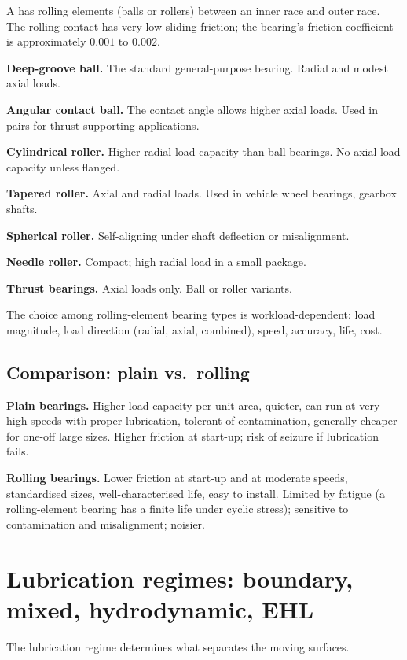 A  has rolling elements (balls or rollers) between an inner race and outer race. The rolling contact has very low sliding friction; the bearing's friction coefficient is approximately $0.001$ to $0.002$.

\textbf{Deep-groove ball.} The standard general-purpose bearing. Radial and modest axial loads.

\textbf{Angular contact ball.} The contact angle allows higher axial loads. Used in pairs for thrust-supporting applications.

\textbf{Cylindrical roller.} Higher radial load capacity than ball bearings. No axial-load capacity unless flanged.

\textbf{Tapered roller.} Axial and radial loads. Used in vehicle wheel bearings, gearbox shafts.

\textbf{Spherical roller.} Self-aligning under shaft deflection or misalignment.

\textbf{Needle roller.} Compact; high radial load in a small package.

\textbf{Thrust bearings.} Axial loads only. Ball or roller variants.

The choice among rolling-element bearing types is workload-dependent: load magnitude, load direction (radial, axial, combined), speed, accuracy, life, cost.

\subsection{Comparison: plain vs.\ rolling}

\textbf{Plain bearings.} Higher load capacity per unit area, quieter, can run at very high speeds with proper lubrication, tolerant of contamination, generally cheaper for one-off large sizes. Higher friction at start-up; risk of seizure if lubrication fails.

\textbf{Rolling bearings.} Lower friction at start-up and at moderate speeds, standardised sizes, well-characterised life, easy to install. Limited by fatigue (a rolling-element bearing has a finite life under cyclic stress); sensitive to contamination and misalignment; noisier.

\section{Lubrication regimes: boundary, mixed, hydrodynamic, EHL}

The lubrication regime determines what separates the moving surfaces.

